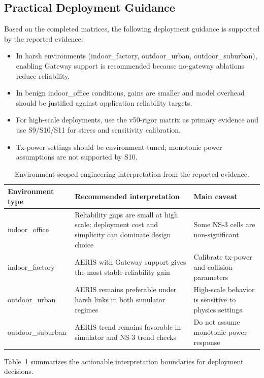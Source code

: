 ﻿\documentclass[sensors,article,submit,moreauthors,pdftex]{Definitions/mdpi}
\begin{document}
\subsection*{Practical Deployment Guidance}
Based on the completed matrices, the following deployment guidance is supported by the reported evidence:
\begin{itemize}
\item In harsh environments (indoor\_factory, outdoor\_urban, outdoor\_suburban), enabling Gateway support is recommended because no-gateway ablations reduce reliability.
\item In benign indoor\_office conditions, gains are smaller and model overhead should be justified against application reliability targets.
\item For high-scale deployments, use the v50-rigor matrix as primary evidence and use S9/S10/S11 for stress and sensitivity calibration.
\item Tx-power settings should be environment-tuned; monotonic power assumptions are not supported by S10.
\end{itemize}

\begin{table}[H]
\caption{Environment-scoped engineering interpretation from the reported evidence.}
\label{tab:deployment_summary}
\centering
\small
\begin{tabular}{>{\raggedright\arraybackslash}p{} >{\raggedright\arraybackslash}p{} >{\raggedright\arraybackslash}p{}}
\toprule
Environment type & Recommended interpretation & Main caveat \\
\midrule
indoor\_office & Reliability gaps are small at high scale; deployment cost and simplicity can dominate design choice & Some NS-3 cells are non-significant \\
indoor\_factory & AERIS with Gateway support gives the most stable reliability gain & Calibrate tx-power and collision parameters \\
outdoor\_urban & AERIS remains preferable under harsh links in both simulator regimes & High-scale behavior is sensitive to physics settings \\
outdoor\_suburban & AERIS trend remains favorable in simulator and NS-3 trend checks & Do not assume monotonic power-response \\
\bottomrule
\end{tabular}
\normalsize
\end{table}

Table~\ref{tab:deployment_summary} summarizes the actionable interpretation boundaries for deployment decisions.
\end{document}
